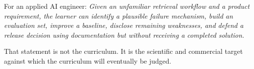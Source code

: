 For an applied AI engineer: \emph{Given an unfamiliar retrieval workflow and a product requirement, the learner can identify a plausible failure mechanism, build an evaluation set, improve a baseline, disclose remaining weaknesses, and defend a release decision using documentation but without receiving a completed solution.}

That statement is not the curriculum. It is the scientific and commercial target against which the curriculum will eventually be judged.
